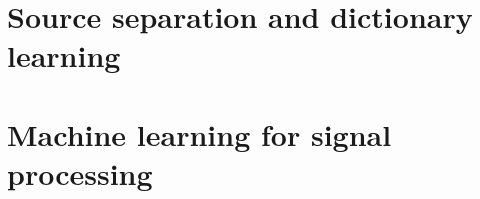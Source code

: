 \documentclass[a4paper, 10pt, dvipsnames]{book}
\begin{document}
\section{Source separation and dictionary learning}
\label{sec:dl}


\section{Machine learning for signal processing}
\label{sec:mlsp}


\ForceHTMLPage





\ForceHTMLPage
\printindex
{}
\end{document}
